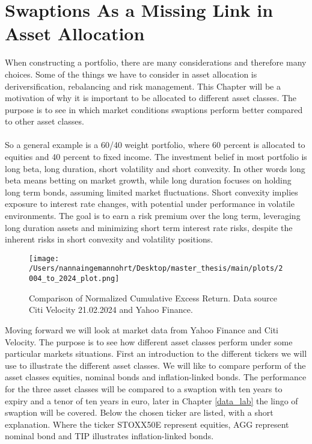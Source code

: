 \section{Swaptions As a Missing Link in Asset Allocation}
When constructing a portfolio, there are many considerations and therefore many choices. 
Some of the things we have to consider in asset allocation is deriversification, rebalancing 
and risk management. This Chapter will be a motivation of why it is important to be 
allocated to different asset classes. The purpose is to see in which market conditions
swaptions perform better compared to other asset classes.
\\\\
So a general  example is a 60/40 weight portfolio, where 60 percent is allocated to equities 
and 40 percent to fixed income. 
The investment belief in most portfolio is long beta, long duration, short volatility and short 
convexity. 
In other words long beta means betting on market growth, while long duration 
focuses on holding long term bonds, assuming limited market fluctuations. 
Short convexity implies exposure to interest rate changes,
with potential under performance in volatile environments. 
The goal is to earn a risk premium over the long term, 
leveraging long duration assets and minimizing short term interest rate risks, despite the inherent risks in short 
convexity and volatility positions.
\begin{figure}[H]
    \centering
    \texttt{[image: /Users/nannaingemannohrt/Desktop/master\_thesis/main/plots/2004\_to\_2024\_plot.png]}
    \caption{Comparison of Normalized Cumulative Excess Return. Data source Citi Velocity 21.02.2024 
    and Yahoo Finance.}
    \label{fig:2004_2024}
\end{figure}
\noindent
Moving forward we will look at market data from Yahoo Finance and Citi Velocity. 
The purpose is to see how different asset classes perform under some particular markets situations.
First an introduction to the different tickers we will use to illustrate the different asset classes. 
We will like to compare perform of the asset classes equities, nominal bonds and inflation-linked bonds. 
The performance for the three asset classes will be compared to a swaption with ten years to expiry and a tenor
of ten years in euro, later in Chapter \ref{data_lab} the lingo of swaption will be covered. 
Below the chosen ticker are listed, with a short explanation. Where the ticker STOXX50E represent equities, 
AGG represent nominal bond and TIP illustrates inflation-linked bonds.

